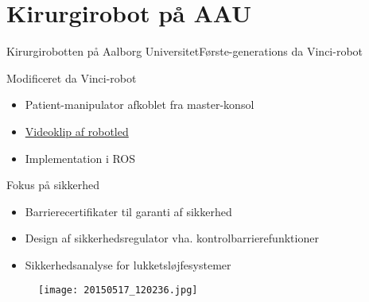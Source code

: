 \section{Kirurgirobot på AAU}
\begin{frame}{Kirurgirobotten på Aalborg Universitet}{Første-generations da Vinci-robot}
\begin{minipage}[b]{0.55\linewidth}
	\vspace{2mm}
\begin{block}{Modificeret da Vinci-robot}
	\begin{itemize}
		\item Patient-manipulator afkoblet fra master-konsol 
		\item \href{file:video/davinci_joints.mp4}{Videoklip af robotled}
		\item Implementation i ROS
	\end{itemize}
\end{block}
\vspace{-1mm}
\begin{block}{Fokus på sikkerhed}
	\begin{itemize}
		\item Barrierecertifikater til garanti af sikkerhed
		\item Design af sikkerhedsregulator vha. kontrolbarrierefunktioner
		\item Sikkerhedsanalyse for lukketsløjfesystemer
	\end{itemize}
\end{block}
\end{minipage}
\hspace{0.1cm}
\begin{minipage}[b]{0.4\linewidth}
	\begin{figure}[h]
		\centering
		\texttt{[image: 20150517\_120236.jpg]}
	\end{figure}
\end{minipage}
\vspace{1cm}
\end{frame}

